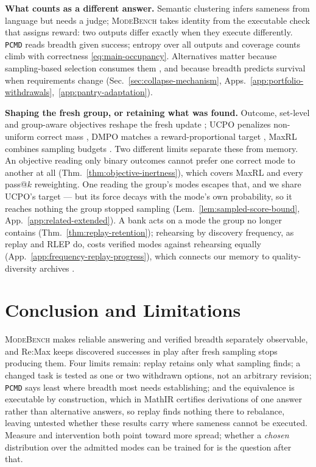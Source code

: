 \documentclass{article}
\newcommand{\1}{\mathbf 1}
\newcommand{\mb}{\textsc{ModeBench}}
\newcommand{\pmd}{\texttt{PCMD}}
\theoremstyle{remark}
\theoremstyle{definition}
\theoremstyle{plain}
\begin{document}
\textbf{What counts as a different answer.} Semantic clustering infers sameness
from language \citep{farquhar2024detecting} but needs a judge; \mb{} takes
identity from the executable check that assigns reward: two outputs differ
exactly when they execute differently. \pmd{} reads breadth given success;
entropy over all outputs and coverage counts climb with correctness
\eqref{eq:main-occupancy}. Alternatives matter because sampling-based selection
consumes them
\citep{brown2024monkeys,snell2024testtime,cobbe2021training,lightman2023lets},
and because breadth predicts survival when requirements change
(Sec.~\ref{sec:collapse-mechanism},
Apps.~\ref{app:portfolio-withdrawals},~\ref{app:pantry-adaptation}).

\textbf{Shaping the fresh group, or retaining what was found.} Outcome,
set-level and group-aware objectives reshape the fresh update
\citep{song2025outcome,chen2025passktraining,li2025divergence,li2026setpo,anschel2025groupaware,chen2026diverse};
UCPO penalizes non-uniform correct mass \citep{lochab2026ucpo}, DMPO matches a
reward-proportional target \citep{li2026distribution}, MaxRL combines sampling
budgets \citep{tajwar2026maxrl}. Two different limits separate these from
memory. An objective reading only binary outcomes cannot prefer one correct
mode to another at all (Thm.~\ref{thm:objective-inertness}), which covers MaxRL
and every pass@$k$ reweighting. One reading the group's modes escapes that, and
we share UCPO's target --- but its force decays with the mode's own
probability, so it reaches nothing the group stopped sampling
(Lem.~\ref{lem:sampled-score-bound}, App.~\ref{app:related-extended}). A bank
acts on a mode the group no longer contains
(Thm.~\ref{thm:replay-retention}); rehearsing by discovery frequency, as replay
\citep{lin1992selfimproving,rolnick2019replay} and RLEP \citep{zhang2025rlep}
do, costs verified modes against rehearsing equally
(App.~\ref{app:frequency-replay-progress}), which connects our memory to
quality-diversity archives \citep{mouret2015illuminating,ecoffet2021return}.

\section{Conclusion and Limitations}
\label{sec:conclusion}
\label{sec:discussion}
\label{sec:limitations}

\mb{} makes reliable answering and verified breadth separately observable, and
Re:Max keeps discovered successes in play after fresh sampling stops
producing them. Four limits remain: replay retains only what sampling finds;
a changed task is tested as one or two withdrawn options, not an arbitrary
revision;
\pmd{} says least where breadth most needs
establishing; and the equivalence is executable by construction, which in
MathIR certifies derivations of one answer rather than alternative answers,
so replay finds nothing there to rebalance,
leaving untested whether these
results carry where sameness cannot be executed. Measure and intervention both
point toward more spread; whether a \emph{chosen} distribution over the
admitted modes can be trained for is the question after that.
\end{document}
